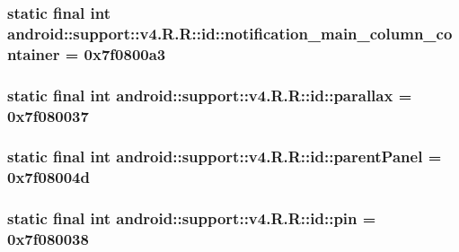 \hypertarget{classandroid_1_1support_1_1v4_1_1_r_1_1id_6405b5101e1c5b029a1216fc930e95ed}{
\subsubsection[{notification\_\-main\_\-column\_\-container}]{\setlength{\rightskip}{0pt plus 5cm}static final int android::support::v4.R.R::id::notification\_\-main\_\-column\_\-container = 0x7f0800a3}}
\label{classandroid_1_1support_1_1v4_1_1_r_1_1id_6405b5101e1c5b029a1216fc930e95ed}


\hypertarget{classandroid_1_1support_1_1v4_1_1_r_1_1id_e1dbe53f6434fa976a62df2234412b43}{
\subsubsection[{parallax}]{\setlength{\rightskip}{0pt plus 5cm}static final int android::support::v4.R.R::id::parallax = 0x7f080037}}
\label{classandroid_1_1support_1_1v4_1_1_r_1_1id_e1dbe53f6434fa976a62df2234412b43}


\hypertarget{classandroid_1_1support_1_1v4_1_1_r_1_1id_e5c3d44c73862d69bf3231d420dbe935}{
\subsubsection[{parentPanel}]{\setlength{\rightskip}{0pt plus 5cm}static final int android::support::v4.R.R::id::parentPanel = 0x7f08004d}}
\label{classandroid_1_1support_1_1v4_1_1_r_1_1id_e5c3d44c73862d69bf3231d420dbe935}


\hypertarget{classandroid_1_1support_1_1v4_1_1_r_1_1id_96e2596366510e774ede5ee0e0db2455}{
\subsubsection[{pin}]{\setlength{\rightskip}{0pt plus 5cm}static final int android::support::v4.R.R::id::pin = 0x7f080038}}
\label{classandroid_1_1support_1_1v4_1_1_r_1_1id_96e2596366510e774ede5ee0e0db2455}


